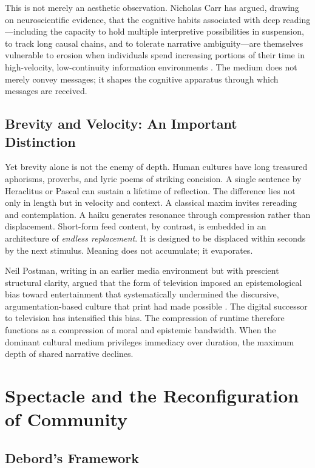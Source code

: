 \documentclass[12pt]{article}
\begin{document}
This is not merely an aesthetic observation. Nicholas Carr has argued, drawing on neuroscientific evidence, that the cognitive habits associated with deep reading---including the capacity to hold multiple interpretive possibilities in suspension, to track long causal chains, and to tolerate narrative ambiguity---are themselves vulnerable to erosion when individuals spend increasing portions of their time in high-velocity, low-continuity information environments \citep{Carr2010}. The medium does not merely convey messages; it shapes the cognitive apparatus through which messages are received.

\subsection{Brevity and Velocity: An Important Distinction}

Yet brevity alone is not the enemy of depth. Human cultures have long treasured aphorisms, proverbs, and lyric poems of striking concision. A single sentence by Heraclitus or Pascal can sustain a lifetime of reflection. The difference lies not only in length but in velocity and context. A classical maxim invites rereading and contemplation. A haiku generates resonance through compression rather than displacement. Short-form feed content, by contrast, is embedded in an architecture of \emph{endless replacement}. It is designed to be displaced within seconds by the next stimulus. Meaning does not accumulate; it evaporates.

Neil Postman, writing in an earlier media environment but with prescient structural clarity, argued that the form of television imposed an epistemological bias toward entertainment that systematically undermined the discursive, argumentation-based culture that print had made possible \citep{Postman1985}. The digital successor to television has intensified this bias. The compression of runtime therefore functions as a compression of moral and epistemic bandwidth. When the dominant cultural medium privileges immediacy over duration, the maximum depth of shared narrative declines.

\section{Spectacle and the Reconfiguration of Community}
\label{sec:spectacle}

\subsection{Debord's Framework}
\end{document}
